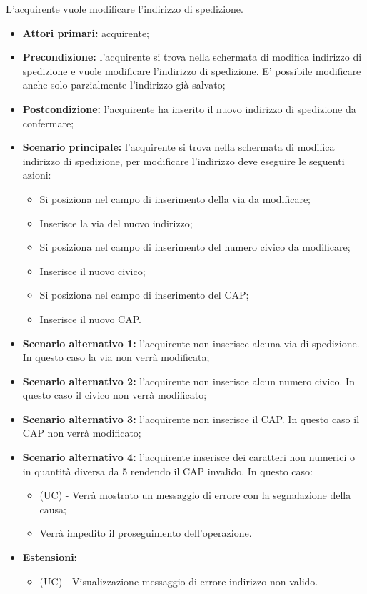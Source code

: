 L'acquirente vuole modificare l'indirizzo di spedizione.
\begin{itemize}
    \item \textbf{Attori primari:} acquirente;
    \item \textbf{Precondizione:} l'acquirente si trova nella schermata di modifica indirizzo di spedizione e vuole modificare l'indirizzo di spedizione. E' possibile modificare anche solo parzialmente l'indirizzo già salvato;
    \item \textbf{Postcondizione:} l'acquirente ha inserito il nuovo indirizzo di spedizione da confermare;
    \item \textbf{Scenario principale:} l'acquirente si trova nella schermata di modifica indirizzo di spedizione, per modificare l'indirizzo deve eseguire le seguenti azioni:
        \begin{itemize}
            \item Si posiziona nel campo di inserimento della via da modificare;
            \item Inserisce la via del nuovo indirizzo;
            \item Si posiziona nel campo di inserimento del numero civico da modificare;
            \item Inserisce il nuovo civico;
            \item Si posiziona nel campo di inserimento del CAP;
            \item Inserisce il nuovo CAP.
        \end{itemize}
    \item \textbf{Scenario alternativo 1:} l'acquirente non inserisce alcuna via di spedizione. In questo caso la via non verrà modificata;
    \item \textbf{Scenario alternativo 2:} l'acquirente non inserisce alcun numero civico. In questo caso il civico non verrà modificato;
    \item \textbf{Scenario alternativo 3:} l'acquirente non inserisce il CAP. In questo caso il CAP non verrà modificato;
    \item \textbf{Scenario alternativo 4:} l'acquirente inserisce dei caratteri non numerici o in quantità diversa da 5 rendendo il CAP invalido. In questo caso:
    \begin{itemize}
        \item (UC) - Verrà mostrato un messaggio di errore con la segnalazione della causa;
        \item Verrà impedito il proseguimento dell'operazione.
    \end{itemize}
    \item \textbf{Estensioni:}
    \begin{itemize}
        \item (UC) - Visualizzazione messaggio di errore  indirizzo non valido.
    \end{itemize}
\end{itemize}

